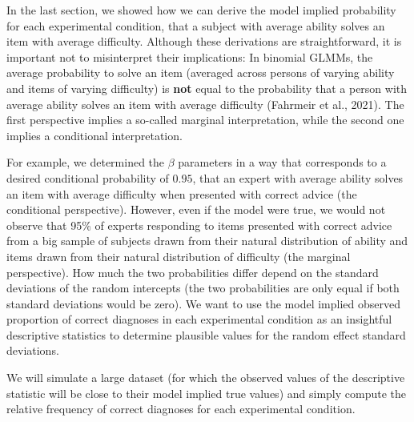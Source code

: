 \documentclass[
  man,floatsintext]{apa6}
\begin{document}
In the last section, we showed how we can derive the model implied probability for each experimental condition, that a subject with average ability solves an item with average difficulty.
Although these derivations are straightforward, it is important not to misinterpret their implications: In binomial GLMMs, the average probability to solve an item (averaged across persons of varying ability and items of varying difficulty) is \textbf{not} equal to the probability that a person with average ability solves an item with average difficulty (Fahrmeir et al., 2021).
The first perspective implies a so-called marginal interpretation, while the second one implies a conditional interpretation.

For example, we determined the \(\beta\) parameters in a way that corresponds to a desired conditional probability of \(0.95\), that an expert with average ability solves an item with average difficulty when presented with correct advice (the conditional perspective).
However, even if the model were true, we would not observe that 95\% of experts responding to items presented with correct advice from a big sample of subjects drawn from their natural distribution of ability and items drawn from their natural distribution of difficulty (the marginal perspective).
How much the two probabilities differ depend on the standard deviations of the random intercepts (the two probabilities are only equal if both standard deviations would be zero).
We want to use the model implied observed proportion of correct diagnoses in each experimental condition as an insightful descriptive statistics to determine plausible values for the random effect standard deviations.

We will simulate a large dataset (for which the observed values of the descriptive statistic will be close to their model implied true values) and simply compute the relative frequency of correct diagnoses for each experimental condition.
\end{document}
